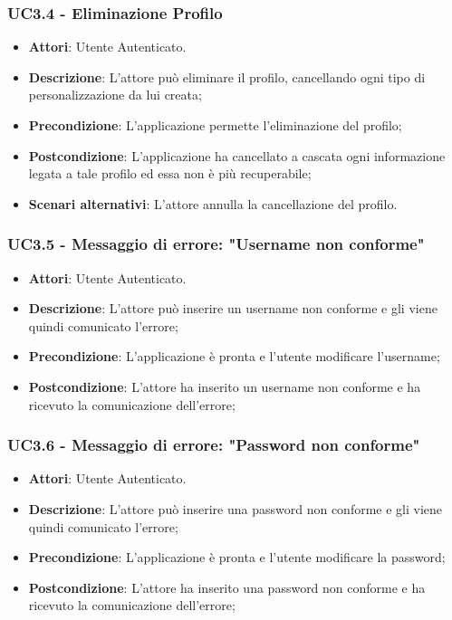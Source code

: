 \subsubsection{UC3.4 - Eliminazione Profilo} 
\label{sssec:UC3.4} 
\begin{itemize} 
\item \textbf{Attori}: Utente Autenticato.
\item \textbf{Descrizione}: L'attore può eliminare il profilo, cancellando ogni tipo di personalizzazione da lui creata;
\item \textbf{Precondizione}: L'applicazione permette l'eliminazione del profilo;
\item \textbf{Postcondizione}: L'applicazione ha cancellato a cascata ogni informazione legata a tale profilo ed essa non è più recuperabile;
\item \textbf{Scenari alternativi}: L'attore annulla la cancellazione del profilo.
\end{itemize} 
\subsubsection{UC3.5 - Messaggio di errore: "Username non conforme"} 
\label{sssec:UC3.5} 
\begin{itemize} 
\item \textbf{Attori}: Utente Autenticato.
\item \textbf{Descrizione}: L'attore può inserire un username non conforme e gli viene quindi comunicato l'errore;
\item \textbf{Precondizione}: L'applicazione è pronta e l'utente modificare l'username;
\item \textbf{Postcondizione}: L'attore ha inserito un username non conforme e ha ricevuto la comunicazione dell'errore;
\end{itemize} 
\subsubsection{UC3.6 - Messaggio di errore: "Password non conforme"} 
\label{sssec:UC3.6} 
\begin{itemize} 
\item \textbf{Attori}: Utente Autenticato.
\item \textbf{Descrizione}: L'attore può inserire una password non conforme e gli viene quindi comunicato l'errore;
\item \textbf{Precondizione}: L'applicazione è pronta e l'utente modificare la password;
\item \textbf{Postcondizione}: L'attore ha inserito una password non conforme e ha ricevuto la comunicazione dell'errore;
\end{itemize} 
